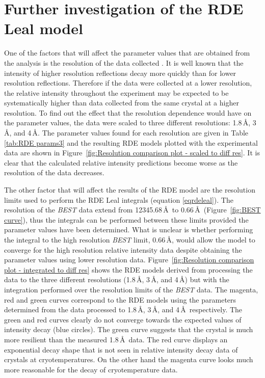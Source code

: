 \section{Further investigation of the RDE Leal model}
\label{sec:Further investigation of the RDE Leal model}

One of the factors that will affect the parameter values that are obtained from the analysis is the resolution of the data collected \cite{leal2012}.
It is well known that the intensity of higher resolution reflections decay more quickly than for lower resolution reflections.
Therefore if the data were collected at a lower resolution, the relative intensity throughout the experiment may be expected to be systematically higher than data collected from the same crystal at a higher resolution.
To find out the effect that the resolution dependence would have on the parameter values, the data were scaled to three different resolutions: 1.8\,\AA, 3\,\AA, and 4\,\AA.
The parameter values found for each resolution are given in Table \ref{tab:RDE params3} and the resulting RDE models plotted with the experimental data are shown in Figure~\ref{fig:Resolution comparison plot - scaled to diff res}.
It is clear that the calculated relative intensity predictions become worse as the resolution of the data decreases.

The other factor that will affect the results of the RDE model are the resolution limits used to perform the RDE Leal integrals (equation \ref{eqrdeleal}).
The resolution of the \textit{BEST} data extend from 12345.68\,\AA\ to 0.66\,\AA\ (Figure~\ref{fig:BEST curve}), thus the integrals can be performed between these limits provided the parameter values have been determined.
What is unclear is whether performing the integral to the high resolution \textit{BEST} limit, 0.66\,\AA, would allow the model to converge for the high resolution relative intensity data despite obtaining the parameter values using lower resolution data.
Figure~\ref{fig:Resolution comparison plot - integrated to diff res} shows the RDE models derived from processing the data to the three different resolutions (1.8\,\AA, 3\,\AA, and 4\,\AA) but with the integration performed over the resolution limits of the \textit{BEST} data.
The magenta, red and green curves correspond to the RDE models using the parameters determined from the data processed to 1.8\,\AA, 3\,\AA, and 4\,\AA\ respectively.
The green and red curves clearly do not converge towards the expected values of intensity decay (blue circles).
The green curve suggests that the crystal is much more resilient than the measured 1.8$\,$\AA\ data.
The red curve displays an exponential decay shape that is not seen in relative intensity decay data of crystals at cryotemperatures.
On the other hand the magenta curve looks much more reasonable for the decay of cryotemperature data.

